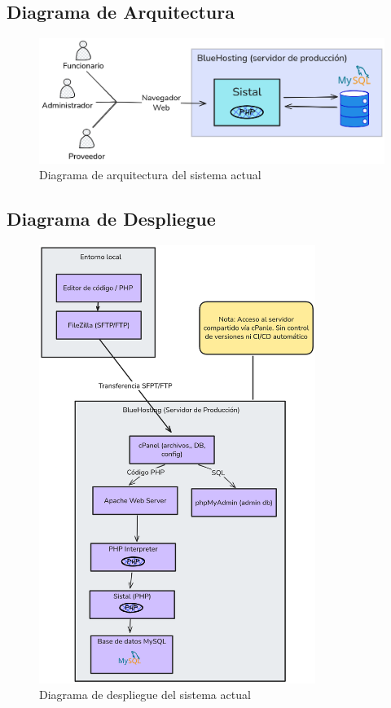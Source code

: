 \subsection{Diagrama de Arquitectura}

\begin{figure}[htbp]
    \centering
    \includegraphics[width=\textwidth]{figuras/diagramas-actuales/diagrama-de-arquitectura}
    \caption{Diagrama de arquitectura del sistema actual}
    \label{fig:diagrama-arq-actual}
\end{figure}

\subsection{Diagrama de Despliegue}

\begin{figure}[htbp]
    \centering
    \includegraphics[width=0.8\textwidth]{figuras/diagramas-actuales/diagrama-de-despliegue}
    \caption{Diagrama de despliegue del sistema actual}
    \label{fig:diagrama-despliegue-actual}
\end{figure}

